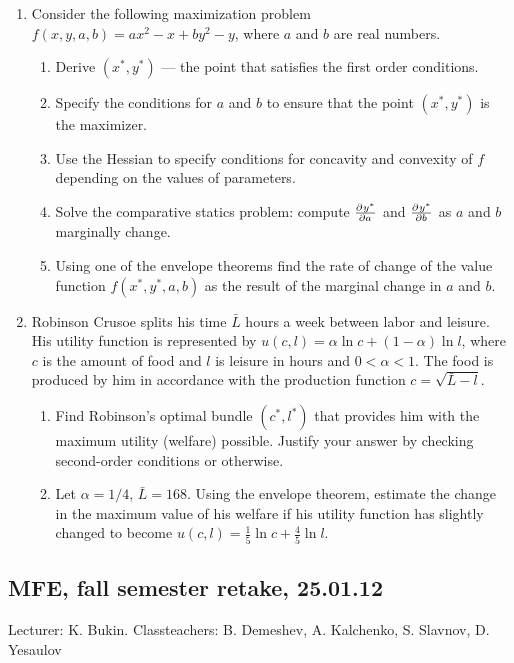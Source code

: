 \documentclass[pdftex,12pt,a4paper]{article}
\begin{document}
\begin{enumerate}
\addtocounter{enumi}{6}
\item Consider the following maximization problem $f(x,y,a,b)=ax^2-x+by^2-y$, where $a$ and $b$ are real numbers.
\begin{enumerate}
\item Derive $(x^*,y^*)$ --- the point that satisfies the first order conditions. 
\item Specify the conditions for $a$ and $b$ to ensure that the point $(x^*,y^*)$ is the maximizer.
\item Use the Hessian to specify conditions for concavity and convexity of $f$ depending on the values of parameters.
\item Solve the comparative statics problem: compute $\pd{y^*}{a}$ and $\pd{y^*}{b}$  as $a$ and $b$ marginally change.
\item Using one of the envelope theorems find the rate of change of the value function $f(x^*,y^*,a,b)$ as the result of the marginal change in $a$ and $b$.
\end{enumerate}

\item Robinson Crusoe splits his time $\bar{L}$ hours a week between labor and leisure. His utility function is represented by $u(c,l)=\alpha \ln c+(1-\alpha)\ln l$, where $c$ is the amount of food and $l$ is leisure in hours and $0<\alpha<1$. The food is produced by him in accordance with the production function $c=\sqrt{\bar{L}-l}$.
\begin{enumerate}
\item Find Robinson’s optimal bundle $(c^*,l^*)$ that provides him with the maximum utility (welfare) possible. Justify your answer by checking second-order conditions or otherwise.
\item Let $\alpha=1/4$, $\bar{L}=168$. Using the envelope theorem, estimate the change in the maximum value of his welfare if his utility function has slightly changed to become $u(c,l)=\frac{1}{5} \ln c+\frac{4}{5}\ln l$.
\end{enumerate}

\end{enumerate}


\subsection{MFE, fall semester retake, 25.01.12 }

Lecturer: K. Bukin. Classteachers: B. Demeshev, A. Kalchenko, S. Slavnov, D. Yesaulov \\
\end{document}

